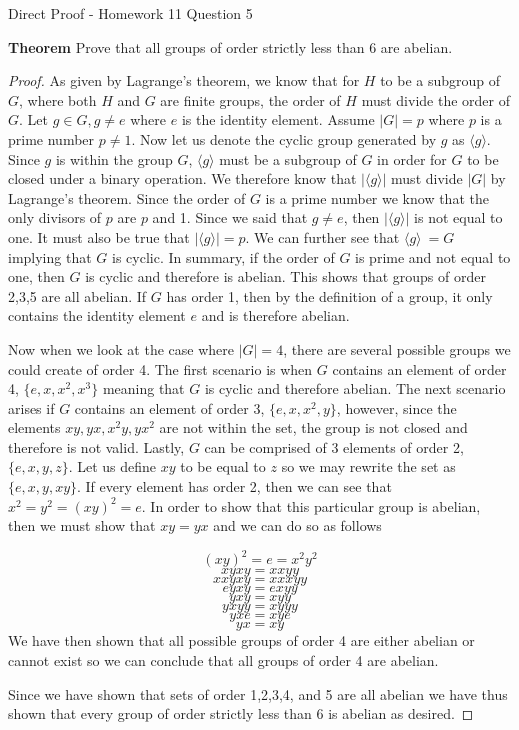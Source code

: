 Direct Proof - Homework 11 Question 5

\textbf{Theorem}
Prove that all groups of order strictly less than $6$ are abelian.

\begin{proof}
As given by Lagrange's theorem, we know that for $H$ to be a subgroup of $G$, where both $H$ and $G$ are finite groups, the order of $H$ must divide the order of $G$. Let $g\in G, g \neq e$ where $e$ is the identity element. Assume $|G| = p$ where $p$ is a prime number $p \neq 1$. Now let us denote the cyclic group generated by $g$ as $\langle g \rangle$. Since $g$ is within the group $G$, $\langle g \rangle$ must be a subgroup of $G$ in order for $G$ to be closed under a binary operation. We therefore know that $|\langle g \rangle|$ must divide $|G|$ by Lagrange's theorem. Since the order of $G$ is a prime number we know that the only divisors of $p$ are $p$ and 1. Since we said that $ g \neq e$, then $|\langle g \rangle|$ is not equal to one. It must also be true that $|\langle g \rangle| = p$. We can further see that $\langle g \rangle \ = G$ implying that $G$ is cyclic. In summary, if the order of $G$ is prime and not equal to one, then $G$ is cyclic and therefore is abelian. This shows that groups of order 2,3,5 are all abelian. If $G$ has order 1, then by the definition of a group, it only contains the identity element $e$ and is therefore abelian. 


Now when we look at the case where $|G| = 4$, there are several possible groups we could create of order 4. The first scenario is when $G$ contains an element of order 4, $\{ e, x, x^2, x^3 \}$ meaning that $G$ is cyclic and therefore abelian. The next scenario arises if $G$ contains an element of order 3, $\{ e, x, x^2, y \}$, however, since the elements $xy, yx, x^2y, yx^2$ are not within the set, the group is not closed and therefore is not valid. Lastly, $G$ can be comprised of 3 elements of order 2, $\{ e, x, y, z \}$. Let us define $xy$ to be equal to $z$ so we may rewrite the set as $\{ e, x, y, xy \}$. If every element has order 2, then we can see that $x^2 = y^2 = (xy)^2 = e$. In order to show that this particular group is abelian, then we must show that $xy = yx$ and we can do so as follows

$$(xy)^2  = e = x^2y^2$$
$$ xyxy=xxyy$$
$$ xxyxy =xxxyy$$
$$ eyxy = exyy$$
$$ yxy = xyy$$
$$ yxyy = xyyy$$
$$ yxe = xye$$
$$yx = xy $$
We have then shown that all possible groups of order 4 are either abelian or cannot exist so we can conclude that all groups of order 4 are abelian.

Since we have shown that sets of order 1,2,3,4, and 5 are all abelian we have thus shown that every group of order strictly less than $6$ is abelian as desired.
\end{proof}